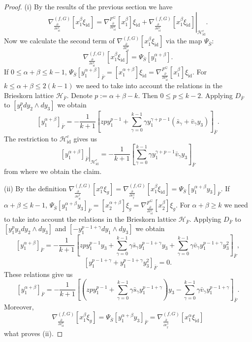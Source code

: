 \documentclass[reqno,12pt]{amsart}
\numberwithin{equation}{section}
\theoremstyle{plain}
\theoremstyle{definition}
\newcommand{\id}{\mathrm{id}}
\def\H{{\mathcal H}}
\numberwithin{equation}{section}
\begin{document}
\begin{proof}

 (i) By the results of the previous section we have
\[
\nabla_{\frac{\partial}{\partial v^\alpha_{\id}}}^{(f,G)}[x_1^{\beta}\xi_{\id}] = \nabla^{F^G}_{\frac{\partial}{\partial v^\alpha_{\id}}}[x_1^{\beta}]\xi_{\id} + \left.\nabla_{\frac{\partial}{\partial v^\alpha_{\id}}}^{(f,G)}[x_1^{\beta}\xi_{\id}]\right\vert_{\H^c_{\id}}.
\]
Now we calculate the second term of $\nabla_{\frac{\partial}{\partial v^\alpha_{\id}}}^{(f,G)}[x_1^{\beta}\xi_{\id}]$ via the map $\Psi_{\bar{S}}$:
\[
\nabla_{\frac{\partial}{\partial v^\alpha_{\id}}}^{(f,G)}[x_1^{\beta}\xi_{\id}] = \Psi_{\bar{S}}[y_1^{\alpha+\beta}].
\]
If $ 0\le \alpha+\beta \le k-1$, $\Psi_{\bar{S}} [y_1^{\alpha+\beta}]_{\bar{F}} = [x_1^{\alpha+\beta}]\xi_{\id} = \nabla^{F^G}_{\frac{\partial}{\partial v^\alpha_\id}}[x_1^{\beta}]\xi_{\id}$. For $ k\le \alpha+\beta \le 2(k-1)$ we need to take into account the relations in the Brieskorn lattice $\H_{\bar F}$. Denote $p := \alpha+\beta - k$. Then $0 \le p \le k-2$. Applying $D_{\bar{F}}$ to $[y_1^{p}dy_2\wedge dy_3]$  we obtain
\[
[y_1^{\alpha+\beta}]_{\bar{F}} = -\frac{1}{k+1}[z p y_1^{p-1} + \sum^{k-1}_{\gamma = 0} \gamma  y_1^{\gamma + p -1}(\bar{s}_\gamma + \bar{v}_\gamma y_3) ]_{\bar{F}}.
\]
The restriction to $\H^c_{\id}$ gives us
\[
\left.[y_1^{\alpha+\beta}]_{\bar{F}}\right\vert_{\H_{\id}^c} = -\frac{1}{k+1}[\sum_{\gamma = 0}^{k-1} \gamma  y_1^{\gamma + p -1}\bar{v}_\gamma y_3]_{\bar{F}}
\]
from where we obtain the claim.


(ii) By the definition $\nabla_{\frac{\partial}{\partial v^\beta_\id}}^{(f,G)}[x_1^{\alpha}\xi_g] = \nabla_{\frac{\partial}{\partial v^\alpha_{g}}}^{(f,G)}[x_1^{\beta}\xi_\id]  = \Psi_{\bar{S}}[y_1^{\alpha+\beta}y_3]_{\bar{F}}$.
If $\alpha+\beta \le k-1$, $\Psi_{\bar{S}}[y_1^{\alpha+\beta}y_3]_{\bar{F}} = [x_2^{\alpha+\beta}] \xi_g = \nabla^{F^G}_{\frac{\partial}{\partial v^\alpha_\id}}[x_2^{\beta}]\xi_{g}$. For $\alpha+\beta \ge k$ we need to take into account the relations in the Brieskorn lattice $\H_{\bar F}$. Applying $D_{\bar{F}}$ to $[y_1^{p}y_3dy_2\wedge dy_3]$ and $[-y_1^{p-1+\gamma}dy_1\wedge dy_3]$ we obtain
\[
[y_1^{\alpha+\beta}]_{\bar{F}} = -\frac{1}{k+1}[z p y_1^{p-1}y_3 + \sum_{\gamma = 0}^{k-1} \gamma\bar{s}_\gamma   y_1^{p-1+\gamma}y_3 + \sum^{k-1}_{\gamma =0} \gamma  \bar{v}_\gamma y_1^{p-1+\gamma}y_3^2 ] _{\bar{F}},
\]
\[
[y_1^{p-1+\gamma} + y_1^{p-1+\gamma}y_3^2]_{\bar{F}} = 0.
\]
These relations give us
\[
[y_1^{\alpha+\beta}]_{\bar{F}} = -\frac{1}{k+1}[(z p y_1^{p-1} + \sum_{\gamma = 0}^{k-1} \gamma\bar{s}_\gamma   y_1^{p-1+\gamma})y_3 - \sum^{k-1}_{\gamma =0} \gamma  \bar{v}_\gamma y_1^{p-1+\gamma} ] _{\bar{F}}.
\]
Moreover,
\[ 
\nabla_{\frac{\partial}{\partial v^\alpha_{\id}}}^{(f,G)}[x_1^{\beta}\xi_g] = \Psi_{\bar{S}}[y_1^{\alpha + \beta}y_3]_{\bar{F}} = 
\nabla_{\frac{\partial}{\partial v^\beta_{g}}}^{(f,G)}[x_1^{\alpha}\xi_{\id}]
\]
what proves (ii).


\end{proof}
\end{document}
